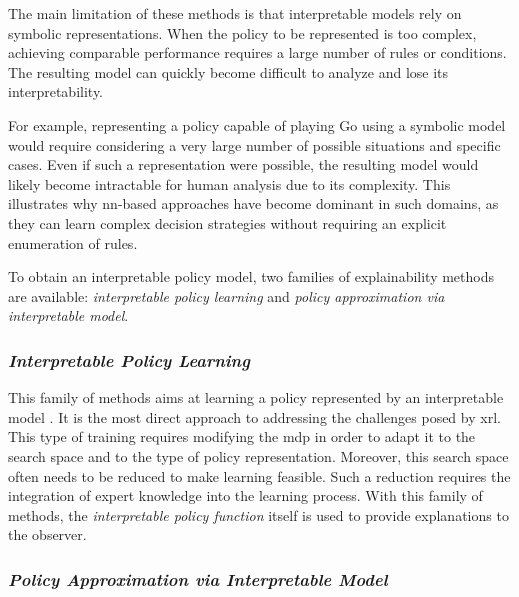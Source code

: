 The main limitation of these methods is that interpretable models rely on symbolic representations.
When the policy to be represented is too complex, achieving comparable performance requires a large number of rules or conditions.
The resulting model can quickly become difficult to analyze and lose its interpretability.


For example, representing a policy capable of playing Go using a symbolic model would require considering a very large number of possible situations and specific cases.
Even if such a representation were possible, the resulting model would likely become intractable for human analysis due to its complexity.
This illustrates why \gls{nn}-based approaches have become dominant in such domains, as they can learn complex decision strategies without requiring an explicit enumeration of rules.

To obtain an interpretable policy model, two families of explainability methods are available: \textit{interpretable policy learning} and \textit{policy approximation via interpretable model}.

\subsubsection{\textit{Interpretable Policy Learning}}
\label{subsubsec:interpretable_policy_learning}

This family of methods aims at learning a policy represented by an interpretable model \parencite{topin2021iterative, trivedi2022learning}.
It is the most direct approach to addressing the challenges posed by \gls{xrl}.
This type of training requires modifying the \gls{mdp} in order to adapt it to the search space and to the type of policy representation.
Moreover, this search space often needs to be reduced to make learning feasible.
Such a reduction requires the integration of expert knowledge into the learning process.
With this family of methods, the \textit{interpretable policy function} itself is used to provide explanations to the observer.

\subsubsection{\textit{Policy Approximation via Interpretable Model}}
\label{subsubsec:policy_approximation_via_interpretable_model}

